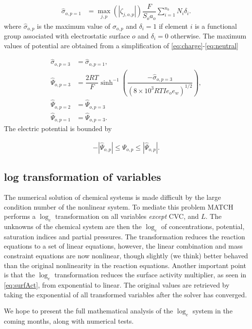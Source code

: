\documentclass{article}
\begin{document}
\begin{align}
    \hat{\sigma}_{o,p=1} &= \max_{j,p}(|\zeta_{j,o,p}|)\dfrac{F}{S_o a_o}\sum_{i=1}^{n_b} N_i \delta_i.
\end{align}
where $\hat{\sigma}_{o,p}$ is the maximum value of $\sigma_{o,p}$ and $\delta_i=1$ if element $i$ is a functional group associated with electrostatic surface $o$
and $\delta_i=0$ otherwise. The maximum values of potential are obtained from a simplification of \eqref{eq:charge}-\eqref{eq:neutral}

\begin{align}
    \hat{\sigma}_{o,p=3} &= \hat{\sigma}_{o,p=1},\\
    \hat{\Psi}_{o,p=3} &= \dfrac{2RT}{F}\sinh^{-1}\left(\dfrac{-\hat{\sigma}_{o,p=3}}{(8\times10^3 R T I e_o e_w)^{1/2}}\right),\\
    \hat{\Psi}_{o,p=2} &= \hat{\Psi}_{o,p=3}\\ 
    \hat{\Psi}_{o,p=1} &= \hat{\Psi}_{o,p=3}.
\end{align}
The electric potential is bounded by 

\begin{align}
    -|\hat{\Psi}_{o,p}| \leq \Psi_{o,p} \leq |\hat{\Psi}_{o,p}|.
\end{align}

\subsection{log transformation of variables}

The numerical solution of chemical systems is made difficult by the large condition number of the nonlinear system. To mediate this problem MATCH performs a $\log_e$ transformation on all variables \emph{except} CVC, and $L$. The unknowns of the chemical system are then the $\log_e$ of concentrations, potential, saturation indices and partial pressures. The transformation reduces the reaction equations to a set of linear equations, however, the linear combination and mass constraint equations are now nonlinear, though slightly (we think) better behaved than the original nonlinearity in the reaction equations. Another important point is that the $\log_e$ transformation reduces the surface activity multiplier, as seen in \eqref{eq:surfAct}, from exponential to linear. The original values are retrieved by taking the exponential of all transformed variables after the solver has converged. 

We hope to present the full mathematical analysis of the $\log_e$ system in the coming months, along with numerical tests. 
\end{document}
